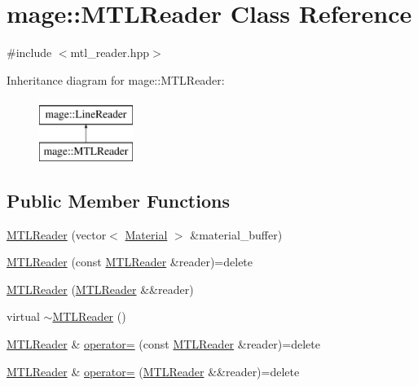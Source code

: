 \hypertarget{classmage_1_1_m_t_l_reader}{}\section{mage\+:\+:M\+T\+L\+Reader Class Reference}
\label{classmage_1_1_m_t_l_reader}


{\ttfamily \#include $<$mtl\+\_\+reader.\+hpp$>$}

Inheritance diagram for mage\+:\+:M\+T\+L\+Reader\+:\begin{figure}[H]
\begin{center}
\leavevmode
\includegraphics[height=2.000000cm]{classmage_1_1_m_t_l_reader}
\end{center}
\end{figure}
\subsection*{Public Member Functions}
\begin{DoxyCompactItemize}
\item 
\hyperlink{classmage_1_1_m_t_l_reader_a924f813cca170e2592a6e7d2a3255be8}{M\+T\+L\+Reader} (vector$<$ \hyperlink{structmage_1_1_material}{Material} $>$ \&material\+\_\+buffer)
\item 
\hyperlink{classmage_1_1_m_t_l_reader_adcc57156298b2198c24c041503df2e6d}{M\+T\+L\+Reader} (const \hyperlink{classmage_1_1_m_t_l_reader}{M\+T\+L\+Reader} \&reader)=delete
\item 
\hyperlink{classmage_1_1_m_t_l_reader_a415057f591e54e91658c77092b7b2d4e}{M\+T\+L\+Reader} (\hyperlink{classmage_1_1_m_t_l_reader}{M\+T\+L\+Reader} \&\&reader)
\item 
virtual \hyperlink{classmage_1_1_m_t_l_reader_a9d3216b2637bc9402d37c7438860f542}{$\sim$\+M\+T\+L\+Reader} ()
\item 
\hyperlink{classmage_1_1_m_t_l_reader}{M\+T\+L\+Reader} \& \hyperlink{classmage_1_1_m_t_l_reader_ae239ac085326919918a418edabcafeae}{operator=} (const \hyperlink{classmage_1_1_m_t_l_reader}{M\+T\+L\+Reader} \&reader)=delete
\item 
\hyperlink{classmage_1_1_m_t_l_reader}{M\+T\+L\+Reader} \& \hyperlink{classmage_1_1_m_t_l_reader_aa777389ff4a3cd2f1df2cbf5c6da708e}{operator=} (\hyperlink{classmage_1_1_m_t_l_reader}{M\+T\+L\+Reader} \&\&reader)=delete
\end{DoxyCompactItemize}
